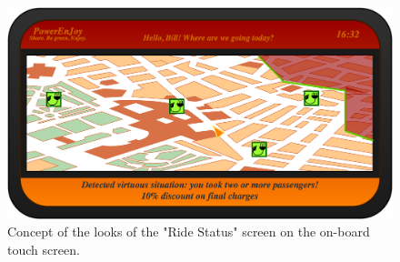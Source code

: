 \begin{figure}[h]
\centering
		\includegraphics[width=\textwidth]{./user_interface_design/diagrams/onboard_ride.png}
		\caption{Concept of the looks of the "Ride Status" screen on the on-board touch screen.}
		\label{onboard_ride}
\end{figure}